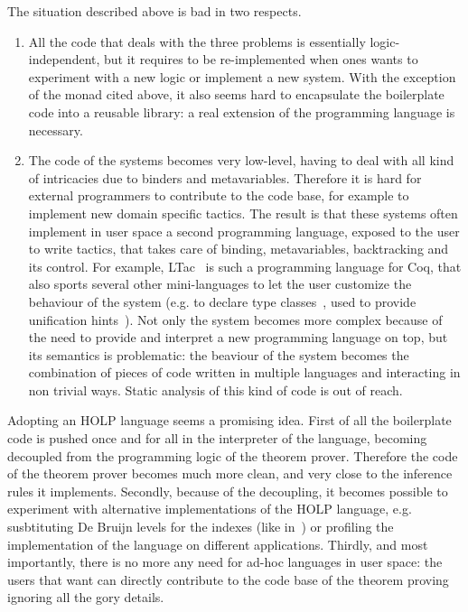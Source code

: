 \documentclass[preprint]{sigplanconf}
\begin{document}
The situation described above is bad in two respects.
\begin{enumerate}
\item All the code that deals with the three problems is essentially logic-independent, but it requires to be re-implemented when ones wants to experiment with a new logic or implement a new system. With the exception of the monad cited above, it also seems hard to encapsulate the boilerplate code into a reusable library: a real extension of the programming language is necessary.
\item The code of the systems becomes very low-level, having to deal with all kind of intricacies due to binders and metavariables. Therefore it is hard for external programmers to contribute to the code base, for example to implement new domain specific tactics. The result is that these systems often implement in user space a second programming language, exposed to the user to write tactics, that takes care of binding, metavariables, backtracking and its control. For example, LTac~\cite{delahaye2000} is such a programming language for Coq, that also sports several other mini-languages to let the user customize the behaviour of the system (e.g. to declare type classes~\cite{ddd}, used to provide unification hints~\cite{asperti1}). Not only the system becomes more complex because of the need to provide and interpret a new programming language on top, but its semantics is problematic: the beaviour of the system becomes the combination of pieces of code written in multiple languages and interacting in non trivial ways. Static analysis of this kind of code is out of reach.
\end{enumerate}

Adopting an HOLP language seems a promising idea. First of all the boilerplate code is pushed once and for all in the interpreter of the language, becoming decoupled from the programming logic of the theorem prover. Therefore the code of the theorem prover becomes much more clean, and very close to the inference rules it implements. Secondly, because of the decoupling, it becomes possible to experiment with alternative implementations of the HOLP language, e.g. susbtituting De Bruijn levels for the indexes (like in~\cite{debrujn1}) or profiling the implementation of the language on different applications. Thirdly, and most importantly, there is no more any need for ad-hoc languages in user space: the users that want can directly contribute to the code base of the theorem proving ignoring all the gory details.
\end{document}
